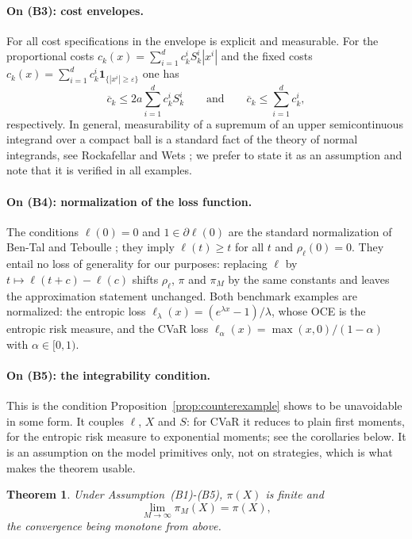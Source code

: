 \documentclass[11pt,a4paper]{report}
\numberwithin{equation}{chapter}
\theoremstyle{plain}
\newtheorem{theorem}[proposition]{Theorem}
\theoremstyle{definition}
\begin{document}
\paragraph{On (B3): cost envelopes.}
For all cost specifications in \cite[Section~2.3]{buehler} the envelope is explicit and measurable. For the proportional costs $c_k(x)=\sum_{i=1}^d c_k^iS_k^i|x^i|$ and the fixed costs $c_k(x)=\sum_{i=1}^dc_k^i\mathbf{1}_{\{|x^i|\ge\varepsilon\}}$ one has
\[
    \overline c_k\le2a\sum_{i=1}^d c_k^iS_k^i
    \qquad\text{and}\qquad
    \overline c_k\le\sum_{i=1}^d c_k^i,
\]
respectively. In general, measurability of a supremum of an upper semicontinuous integrand over a compact ball is a standard fact of the theory of normal integrands, see Rockafellar and Wets \cite[Chapter~14]{rockafellarwets}; we prefer to state it as an assumption and note that it is verified in all examples.

\paragraph{On (B4): normalization of the loss function.}
The conditions $\ell(0)=0$ and $1\in\partial\ell(0)$ are the standard normalization of Ben-Tal and Teboulle \cite{bentalteboulle}; they imply $\ell(t)\ge t$ for all $t$ and $\rho_\ell(0)=0$. They entail no loss of generality for our purposes: replacing $\ell$ by $t\mapsto\ell(t+c)-\ell(c)$ shifts $\rho_\ell$, $\pi$ and $\pi_M$ by the same constants and leaves the approximation statement unchanged. Both benchmark examples are normalized: the entropic loss $\ell_\lambda(x)=(e^{\lambda x}-1)/\lambda$, whose OCE is the entropic risk measure, and the CVaR loss $\ell_\alpha(x)=\max(x,0)/(1-\alpha)$ with $\alpha\in[0,1)$.

\paragraph{On (B5): the integrability condition.}
This is the condition Proposition~\ref{prop:counterexample} shows to be unavoidable in some form. It couples $\ell$, $X$ and $S$: for CVaR it reduces to plain first moments, for the entropic risk measure to exponential moments; see the corollaries below. It is an assumption on the model primitives only, not on strategies, which is what makes the theorem usable.

\begin{theorem}\label{thm:main}
    Under Assumption~\textup{(B1)-(B5)}, $\pi(X)$ is finite and
    \[
        \lim_{M\to\infty}\pi_M(X)=\pi(X),
    \]
    the convergence being monotone from above.
\end{theorem}
\end{document}
